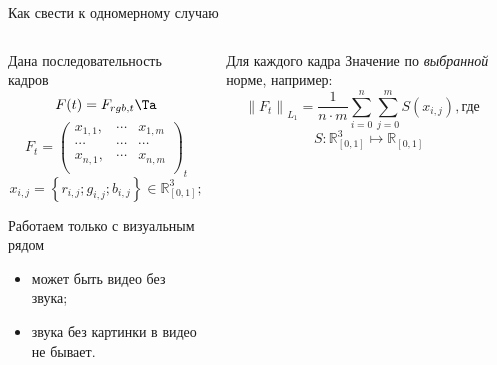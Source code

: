 \begin{frame}{Как свести к одномерному случаю}

\begin{small}
\begin{columns}[t]
    \begin{column}{0.5\textwidth}
        \begin{blue-box}{Дана последовательность кадров}
            \[
                F(t) =  F_{rgb,t}
                \Ta
            \]
            \[
            F_{t} = \left(
                \begin{array}{ccc}
                    x_{1,1}, & \cdots & x_{1,m} \\
                    \cdots   & \cdots & \cdots  \\
                    x_{n,1}, & \cdots & x_{n,m} \\
                \end{array} 
            \right)_t
            \]
            \[
            x_{i,j} = \left\lbrace 
                r_{i,j}; g_{i,j}; b_{i,j} 
            \right\rbrace 
            \in \mathbb{R}^{3}_{[0,1]};
            \]
        \end{blue-box}
        \begin{footnotesize}
            \begin{green-box}{\unskip}
                Работаем только с визуальным рядом
                \begin{itemize}
                    \item может быть видео без звука;
                    \item звука без картинки в видео не бывает.
                \end{itemize}
            \end{green-box}
        \end{footnotesize}
    \end{column}
    \begin{column}{0.5\textwidth}
        \begin{orange-box}{Для каждого кадра}
            Значение по \textit{выбранной} норме,
            например:
            \[
                \left\| F_t \right\|_{L_1} 
                    = \dfrac{1}{n \cdot m} 
                        \sum\limits_{i=0}^{n}
                            \sum\limits_{j=0}^{m}
                                S(x_{i,j}), \text{где}\quad
            \]
            \[
                S: 
                    \mathbb{R}^{3}_{[0,1]} 
                        \longmapsto 
                            \mathbb{R}_{[0,1]}
\]
\end{orange-box}
\end{column}
\end{columns}
\end{small}
\end{frame}
